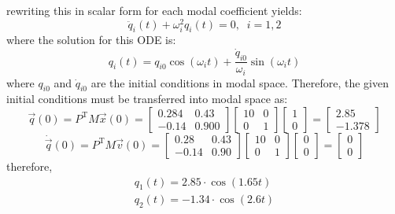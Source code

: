\documentclass[12pt,letter]{article}
\begin{document}
\begin{example}
\begin{equation}
	\end{equation}
	rewriting this in scalar form for each modal coefficient yields:
	\begin{equation}
	\ddot{q}_i(t) + \omega_i^2 q_i (t) = 0, \; \; i=1,2
	\end{equation}
	where the solution for this ODE is:
	\begin{equation}
	q_i(t) = q_{i0} \cos(\omega_i t) +  \frac{\dot{q}_{i0}}{\omega_i} \sin( \omega_i t)
	\end{equation}
	where $q_{i0}$ and $\dot{q}_{i0}$ are the initial conditions in modal space. Therefore, the given initial conditions must be transferred into modal space as:
	\begin{equation}
	\vec{q}(0) = P^\text{T} M \vec{x}(0) = \begin{bmatrix} 0.284 &  0.43 \\  -0.14    & 0.900 \end{bmatrix} \begin{bmatrix} 10 & 0 \\  0  & 1 \end{bmatrix}  \begin{bmatrix} 1 \\  0 \end{bmatrix} =  \begin{bmatrix}  2.85 \\  -1.378 \end{bmatrix}
	\end{equation}
	\begin{equation}
	\dot{\vec{q}}(0) = P^\text{T} M \vec{v}(0) = \begin{bmatrix} 0.28 &  0.43 \\  -0.14    & 0.90 \end{bmatrix} \begin{bmatrix} 10 & 0 \\  0  & 1 \end{bmatrix}  \begin{bmatrix} 0 \\  0 \end{bmatrix} =  \begin{bmatrix}  0 \\  0 \end{bmatrix}
	\end{equation}
	therefore, 
	\begin{eqnarray}
	q_1(t) = 2.85 \cdot \cos (1.65 t) \\ 
	q_2(t) = -1.34 \cdot \cos (2.6 t)  \nonumber
	\label{eq:participation}
	\end{eqnarray}

\end{example}
\end{document}
